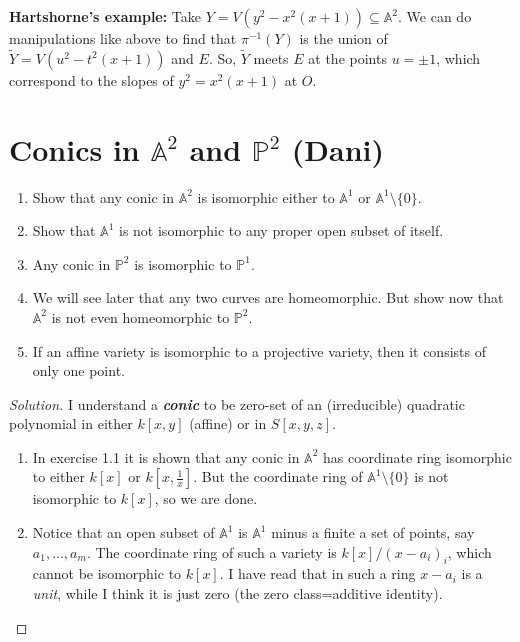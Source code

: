 \textbf{Hartshorne's example:}
Take $Y = V(y^2 - x^2(x+1)) \subseteq \mathbb{A}^2$. We can do manipulations like above to find that $\pi^{-1}(Y)$ is the union of $\tilde{Y} = V(u^2 - t^2(x+1))$ and $E$. So, $\tilde{Y}$ meets $E$ at the points $u=\pm 1$, which correspond to the slopes of $y^2 = x^2(x+1)$ at $O$.

\section{Conics in $\mathbb{A}^2$ and $\mathbb{P}^2$ (Dani)}

\begin{manualexercise}{3.1}
\begin{enumerate}[label=\alph*.]
	\item Show that any conic in $\mathbb{A}^{2} $ is isomorphic either to $\mathbb{A}^{1} $ or $\mathbb{A}^{1}\setminus \{0\} $.

	\item Show that $\mathbb{A}^{1} $ is not isomorphic to any proper open subset of itself.

	\item Any conic in $\mathbb{P}^2$ is isomorphic to $\mathbb{P}^1$.

	\item We will see later that any two curves are homeomorphic. But show now that $\mathbb{A}^{2} $ is not even homeomorphic to $\mathbb{P}^2$.

	\item If an affine variety is isomorphic to a projective variety, then it consists of only one point.
\end{enumerate}

\begin{proof}[Solution] I understand a \textit{\textbf{conic}} to be zero-set of an (irreducible) quadratic polynomial in either $k[x,y]$ (affine) or in  $S[x,y,z]$.
	\begin{enumerate}[label=\alph*.]
		\item In exercise 1.1 it is shown that any conic in $\mathbb{A}^{2} $ has coordinate ring isomorphic to either $k[x]$ or $k[x,\frac{1}{x}]$. But the coordinate ring of  $\mathbb{A}^{1}\setminus \{0\} $ is not isomorphic to $k[x]$, so we are done.

		\item Notice that an open subset of $\mathbb{A}^{1}$ is $\mathbb{A}^{1} $ minus a finite a set of points, say $a_1,\ldots,a_m$. The coordinate ring of such a variety is $k[x]/(x-a_i)_{i}$, which cannot be isomorphic to $k[x]$. {\color{magenta}I have read that in such a ring $x-a_i$ is a \textit{unit}, while I think it is just zero (the zero class=additive identity).}


\end{enumerate}
\end{proof}
\end{manualexercise}
